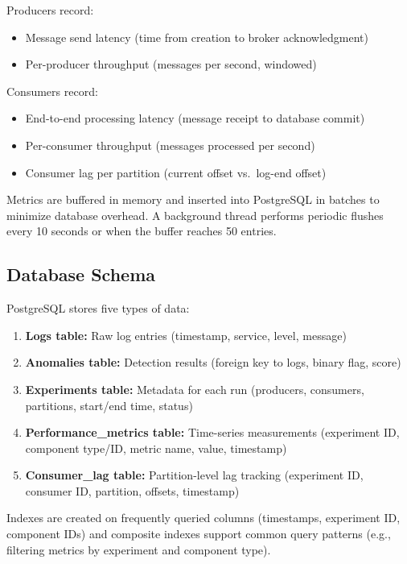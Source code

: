 \documentclass[12pt,a4paper]{report}
\begin{document}
Producers record:
\begin{itemize}
    \item Message send latency (time from creation to broker acknowledgment)
    \item Per-producer throughput (messages per second, windowed)
\end{itemize}

Consumers record:
\begin{itemize}
    \item End-to-end processing latency (message receipt to database commit)
    \item Per-consumer throughput (messages processed per second)
    \item Consumer lag per partition (current offset vs.\ log-end offset)
\end{itemize}

Metrics are buffered in memory and inserted into PostgreSQL in batches to minimize database overhead. A background thread performs periodic flushes every 10 seconds or when the buffer reaches 50 entries.

\subsection{Database Schema}

PostgreSQL stores five types of data:

\begin{enumerate}
    \item \textbf{Logs table:} Raw log entries (timestamp, service, level, message)
    \item \textbf{Anomalies table:} Detection results (foreign key to logs, binary flag, score)
    \item \textbf{Experiments table:} Metadata for each run (producers, consumers, partitions, start/end time, status)
    \item \textbf{Performance\_metrics table:} Time-series measurements (experiment ID, component type/ID, metric name, value, timestamp)
    \item \textbf{Consumer\_lag table:} Partition-level lag tracking (experiment ID, consumer ID, partition, offsets, timestamp)
\end{enumerate}

Indexes are created on frequently queried columns (timestamps, experiment ID, component IDs) and composite indexes support common query patterns (e.g., filtering metrics by experiment and component type).
\end{document}

